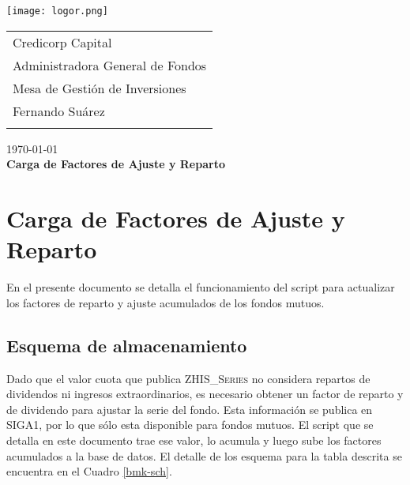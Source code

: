 \documentclass{article}
\begin{document}
\texttt{[image: logor.png]}
\vspace*{-1.55cm}

\hspace*{1.4 cm}
 \hspace*{2.9 cm}
 {\footnotesize
 \begin{tabular}{l}
  \sc Credicorp Capital\\
  \sc Administradora General de Fondos \\
  \sc Mesa de Gestión de Inversiones  \\
  \sc Fernando Suárez  \\
  \vspace{15\baselineskip}\mbox{}
  \vspace{-3mm}\mbox{}
 \end{tabular}
}

 \bigskip

\vspace*{5mm}
\begin{center}
{\today} \\
\vspace{3mm}
{\Large\bf Carga de Factores de Ajuste y Reparto} \\
\vspace{2mm}
\end{center}
\section{Carga de Factores de Ajuste y Reparto}


En el presente documento se detalla el funcionamiento del script para actualizar los factores de reparto y ajuste acumulados de los fondos mutuos.


\subsection{Esquema de almacenamiento}


\par Dado que el valor cuota que publica \textsc{ZHIS\_Series} no considera repartos de dividendos ni ingresos extraordinarios, es necesario obtener un factor de reparto y de dividendo para ajustar la serie del fondo. Esta información se publica en SIGA1, por lo que sólo esta disponible para fondos mutuos. El script que se detalla en este documento trae ese valor, lo acumula y luego sube los factores acumulados a la base de datos. El detalle de los esquema para la tabla descrita se encuentra en el Cuadro \ref{bmk-sch}.
\end{document}

